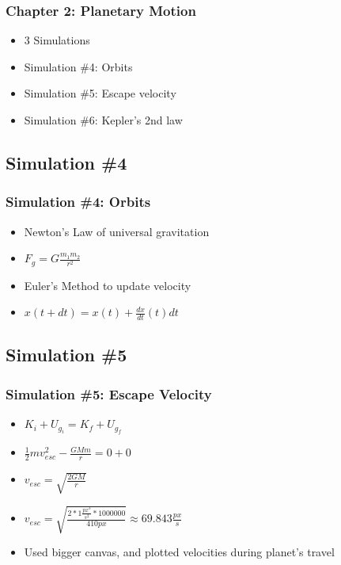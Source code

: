 \documentclass{beamer}
\begin{document}
\begin{frame}
\frametitle{Chapter 2: Planetary Motion}
\begin{itemize}
\item 3 Simulations
\item Simulation \#4: Orbits
\item Simulation \#5: Escape velocity
\item Simulation \#6: Kepler's 2nd law

\end{itemize}
\end{frame}

\subsection{Simulation \#4}

\begin{frame}
\frametitle{Simulation \#4: Orbits}

\begin{itemize}

\item Newton's Law of universal gravitation
\item $ 
F_g = G \frac{m_1 m_2}{r^2}  $

\vspace{1cm}
\item  Euler's Method to update velocity 
\item $
x(t+dt) = x(t) + \frac{dx}{dt}\left(t\right) dt
$



\end{itemize}

\end{frame}

\subsection{Simulation \#5}



\begin{frame}
\frametitle{Simulation \#5: Escape Velocity}

\begin{itemize}

\item $K_i + U_{g_{i}} = K_f + U_{g_{f}}$

\item $\frac{1}{2}mv_{esc}^2 - \frac{GMm}{r} = 0 + 0  $

\item $
v_{esc} = \sqrt{\frac{2GM}{r}}
$

\item $
 v_{esc} = \sqrt{\frac{2*1 \frac{px^3}{s^2}*1000000}{410 px}} \approx 69.843 \frac{px}{s} 
$
\vspace{1cm}

\item Used bigger canvas, and plotted velocities during planet's travel

\end{itemize}

\end{frame}
\end{document}

